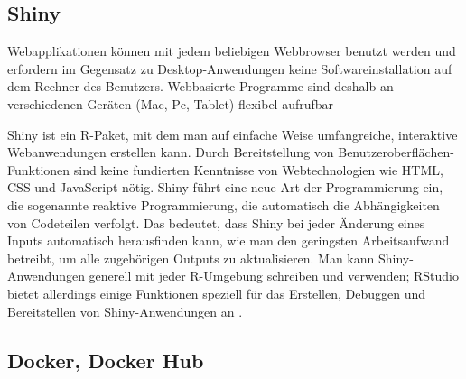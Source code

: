 \documentclass[12pt,a4paper]{article}
\begin{document}



\subsection{Shiny}

Webapplikationen können mit jedem beliebigen Webbrowser benutzt werden und erfordern im Gegensatz zu Desktop-Anwendungen keine Softwareinstallation auf dem Rechner des Benutzers. 
Webbasierte Programme sind deshalb an verschiedenen Geräten (Mac, Pc, Tablet) flexibel aufrufbar \cite{.03.03.2022b}

Shiny ist ein R-Paket, mit dem man auf einfache Weise umfangreiche, interaktive Webanwendungen erstellen kann. Durch Bereitstellung von Benutzeroberflächen-Funktionen sind keine fundierten Kenntnisse von Webtechnologien wie HTML, CSS und JavaScript nötig. Shiny führt eine neue Art der Programmierung ein, die sogenannte reaktive Programmierung, die automatisch die Abhängigkeiten von Codeteilen verfolgt. Das bedeutet, dass Shiny bei jeder Änderung eines Inputs automatisch herausfinden kann, wie man den geringsten Arbeitsaufwand betreibt, um alle zugehörigen Outputs zu aktualisieren. Man kann Shiny-Anwendungen generell mit jeder R-Umgebung schreiben und verwenden; RStudio bietet allerdings einige Funktionen speziell für das Erstellen, Debuggen und Bereitstellen von Shiny-Anwendungen an \cite{Wickham.22.03.2022}. 







\subsection{Docker, Docker Hub}
\end{document}
